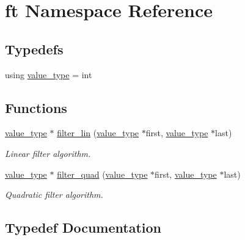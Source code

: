\hypertarget{namespaceft}{}\section{ft Namespace Reference}
\label{namespaceft}
\subsection*{Typedefs}
\begin{DoxyCompactItemize}
\item 
using \mbox{\hyperlink{namespaceft_a076c091630cdeb4076ec793da6ab56c0}{value\+\_\+type}} = int
\end{DoxyCompactItemize}
\subsection*{Functions}
\begin{DoxyCompactItemize}
\item 
\mbox{\hyperlink{namespaceft_a076c091630cdeb4076ec793da6ab56c0}{value\+\_\+type}} $\ast$ \mbox{\hyperlink{namespaceft_a4316f330162c6d79eef57fa84bf0ac68}{filter\+\_\+lin}} (\mbox{\hyperlink{namespaceft_a076c091630cdeb4076ec793da6ab56c0}{value\+\_\+type}} $\ast$first, \mbox{\hyperlink{namespaceft_a076c091630cdeb4076ec793da6ab56c0}{value\+\_\+type}} $\ast$last)
\begin{DoxyCompactList}\small\item\em Linear filter algorithm. \end{DoxyCompactList}\item 
\mbox{\hyperlink{namespaceft_a076c091630cdeb4076ec793da6ab56c0}{value\+\_\+type}} $\ast$ \mbox{\hyperlink{namespaceft_ad44a5fa501d9597c6b2d057a379f4803}{filter\+\_\+quad}} (\mbox{\hyperlink{namespaceft_a076c091630cdeb4076ec793da6ab56c0}{value\+\_\+type}} $\ast$first, \mbox{\hyperlink{namespaceft_a076c091630cdeb4076ec793da6ab56c0}{value\+\_\+type}} $\ast$last)
\begin{DoxyCompactList}\small\item\em Quadratic filter algorithm. \end{DoxyCompactList}\end{DoxyCompactItemize}


\subsection{Typedef Documentation}
\mbox{\label{namespaceft_a076c091630cdeb4076ec793da6ab56c0}} 
